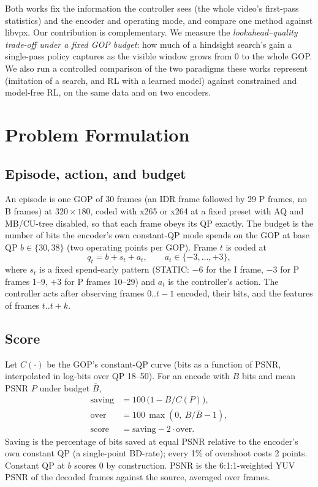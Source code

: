 \documentclass[conference]{IEEEtran}
\begin{document}
Both works fix the information the controller sees (the whole video's first-pass statistics) and the encoder and operating mode, and compare one method against libvpx. Our contribution is complementary. We measure the \emph{lookahead--quality trade-off under a fixed GOP budget}: how much of a hindsight search's gain a single-pass policy captures as the visible window grows from 0 to the whole GOP. We also run a controlled comparison of the two paradigms these works represent (imitation of a search, and RL with a learned model) against constrained and model-free RL, on the same data and on two encoders.

\section{Problem Formulation}\label{sec:problem}
\subsection{Episode, action, and budget}
An episode is one GOP of 30 frames (an IDR frame followed by 29 P frames, no B frames) at $320{\times}180$, coded with x265 or x264 at a fixed preset with AQ and MB/CU-tree disabled, so that each frame obeys its QP exactly. The budget is the number of bits the encoder's own constant-QP mode spends on the GOP at base QP $b \in \{30, 38\}$ (two operating points per GOP). Frame $t$ is coded at
\begin{equation}
q_t = b + s_t + a_t,\qquad a_t \in \{-3,\dots,+3\},
\end{equation}
where $s_t$ is a fixed spend-early pattern (STATIC: $-6$ for the I frame, $-3$ for P frames 1--9, $+3$ for P frames 10--29) and $a_t$ is the controller's action. The controller acts after observing frames $0..t{-}1$ encoded, their bits, and the features of frames $t..t{+}k$.

\subsection{Score}
Let $C(\cdot)$ be the GOP's constant-QP curve (bits as a function of PSNR, interpolated in log-bits over QP 18--50). For an encode with $B$ bits and mean PSNR $P$ under budget $\bar B$,
\begin{align}
\text{saving} &= 100\,\big(1 - B / C(P)\big),\\
\text{over} &= 100\,\max(0,\ B/\bar B - 1),\\
\text{score} &= \text{saving} - 2\cdot\text{over}.
\end{align}
Saving is the percentage of bits saved at equal PSNR relative to the encoder's own constant QP (a single-point BD-rate); every 1\% of overshoot costs 2 points. Constant QP at $b$ scores 0 by construction. PSNR is the 6:1:1-weighted YUV PSNR of the decoded frames against the source, averaged over frames.
\end{document}
